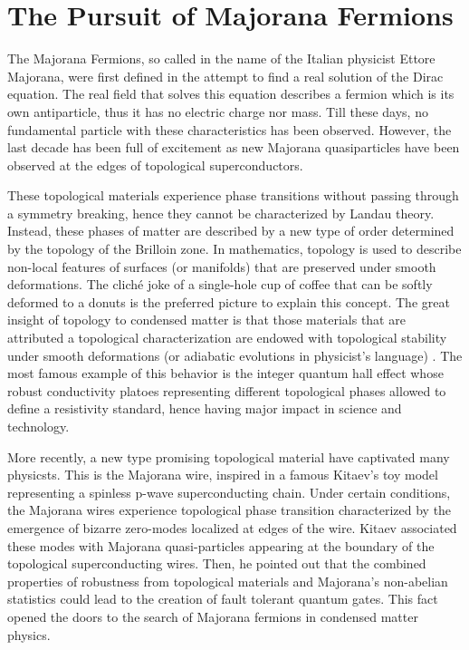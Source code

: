 \chapter{The Pursuit of Majorana Fermions \label{chap:Majorana}}



The  Majorana Fermions, so called in the name of the Italian physicist Ettore Majorana, were first defined in the attempt to find a real solution of the Dirac equation. The real field that solves this equation describes a fermion which is its own antiparticle, thus it has no electric charge  nor mass.  Till these days, no fundamental particle with these characteristics has been observed. However, the last decade has been full of excitement as new Majorana quasiparticles have been observed at the edges of topological superconductors.


These topological materials experience phase transitions without passing through a symmetry breaking, hence they cannot be characterized by Landau theory. Instead, these phases of matter are described by  a new type of order determined by the topology of the Brilloin zone. In mathematics, topology is used to describe non-local features of surfaces (or manifolds) that are preserved under smooth deformations. The clich\'e joke of a single-hole cup of coffee that can be softly deformed to a donuts is the preferred picture to explain this concept.
The great insight of topology to condensed matter is that those materials that are attributed a topological characterization are endowed with topological  stability under smooth deformations (or adiabatic evolutions in physicist's language) . The most famous example of this behavior is the integer quantum hall effect whose robust conductivity platoes representing different topological phases allowed to define a resistivity standard, hence having major impact in science and technology.

More recently, a new type promising topological material have captivated many physicsts. This is the Majorana wire, inspired in a famous Kitaev's toy model representing a spinless p-wave superconducting chain. Under certain conditions, the Majorana wires experience topological phase transition characterized by the emergence of bizarre zero-modes localized at edges of the wire. Kitaev associated these modes with Majorana quasi-particles  appearing at the boundary of the topological superconducting wires. Then, he pointed out that the combined properties of robustness from topological materials and Majorana's non-abelian statistics could lead to the creation of fault tolerant quantum gates. This fact opened the doors to the search of Majorana fermions in condensed matter physics. 

